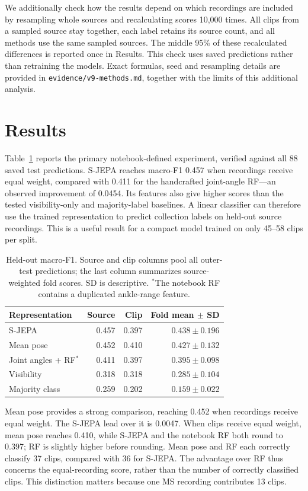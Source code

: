 \documentclass[10pt,twocolumn,letterpaper]{article}
\begin{document}
We additionally check how the results depend on which recordings are included by resampling whole sources and recalculating scores 10,000 times. All clips from a sampled source stay together, each label retains its source count, and all methods use the same sampled sources. The middle 95\% of these recalculated differences is reported once in Results. This check uses saved predictions rather than retraining the models. Exact formulas, seed and resampling details are provided in \texttt{evidence/v9-methods.md}, together with the limits of this additional analysis.

\section{Results}
Table~\ref{tab:results} reports the primary notebook-defined experiment, verified against all 88 saved test predictions. S-JEPA reaches macro-F1 0.457 when recordings receive equal weight, compared with 0.411 for the handcrafted joint-angle RF---an observed improvement of 0.0454. Its features also give higher scores than the tested visibility-only and majority-label baselines. A linear classifier can therefore use the trained representation to predict collection labels on held-out source recordings. This is a useful result for a compact model trained on only 45--58 clips per split.

\begin{table}[t]
\centering
\caption{Held-out macro-F1. Source and clip columns pool all outer-test predictions; the last column summarizes source-weighted fold scores. SD is descriptive. $^*$The notebook RF contains a duplicated ankle-range feature.}
\label{tab:results}
\small
\setlength{\tabcolsep}{4pt}
\begin{tabular}{lrrr}
\toprule
Representation & Source & Clip & Fold mean $\pm$ SD\\
\midrule
S-JEPA &0.457&0.397&$0.438\pm0.196$\\
Mean pose &0.452&0.410&$0.427\pm0.132$\\
Joint angles + RF$^*$ &0.411&0.397&$0.395\pm0.098$\\
Visibility &0.318&0.318&$0.285\pm0.104$\\
Majority class &0.259&0.202&$0.159\pm0.022$\\
\bottomrule
\end{tabular}
\end{table}

Mean pose provides a strong comparison, reaching 0.452 when recordings receive equal weight. The S-JEPA lead over it is 0.0047. When clips receive equal weight, mean pose reaches 0.410, while S-JEPA and the notebook RF both round to 0.397; RF is slightly higher before rounding. Mean pose and RF each correctly classify 37 clips, compared with 36 for S-JEPA. The advantage over RF thus concerns the equal-recording score, rather than the number of correctly classified clips. This distinction matters because one MS recording contributes 13 clips.
\end{document}
